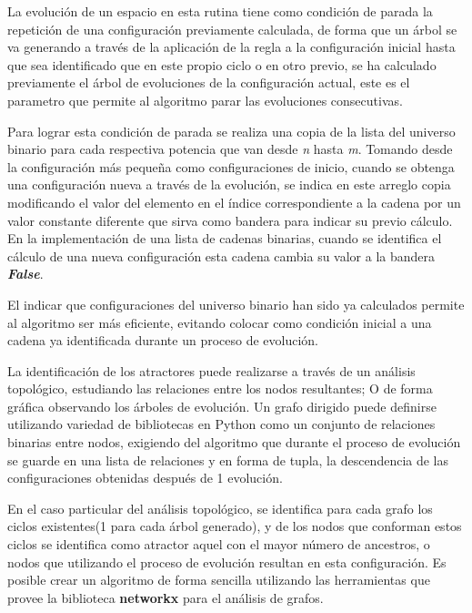 \documentclass[]{article}
\begin{document}
			\hfill\break
			\justifying
			La evolución de un espacio en esta rutina tiene como condición de parada la repetición de una configuración previamente calculada, de forma que un árbol se va generando a través de la aplicación de la regla a la configuración inicial hasta que sea identificado que en este propio ciclo o en otro previo, se ha calculado previamente el árbol de evoluciones de la configuración actual, este es el parametro que permite al algoritmo parar las evoluciones consecutivas.
			
			\hfill\break
			\justifying
			Para lograr esta condición de parada se realiza una copia de la lista del universo binario para cada respectiva potencia que van desde \textit{n} hasta \textit{m}. Tomando desde la configuración más pequeña como configuraciones de inicio, cuando se obtenga una configuración nueva a través de la evolución, se indica en este arreglo copia modificando el valor del elemento en el índice correspondiente a la cadena por un valor constante diferente que sirva como bandera para indicar su previo cálculo. En la implementación de una lista de cadenas binarias, cuando se identifica el cálculo de una nueva configuración esta cadena cambia su valor a la bandera \textit{\textbf{False}}.
			
			\hfill\break
			\justifying
			El indicar que configuraciones del universo binario han sido ya calculados permite al algoritmo ser más eficiente, evitando colocar como condición inicial a una cadena ya identificada durante un proceso de evolución.
			
			\hfill\break
			\justifying
			La identificación de los atractores puede realizarse a través de un análisis topológico, estudiando las relaciones entre los nodos resultantes; O de forma gráfica observando los árboles de evolución. Un grafo dirigido puede definirse utilizando variedad de bibliotecas en Python como un conjunto de relaciones binarias entre nodos, exigiendo del algoritmo que durante el proceso de evolución se guarde en una lista de relaciones y en forma de tupla, la descendencia de las configuraciones obtenidas después de 1 evolución.
			
			\hfill\break
			\justifying
			En el caso particular del análisis topológico, se identifica para cada grafo los ciclos existentes(1 para cada árbol generado), y de los nodos que conforman estos ciclos se identifica como atractor aquel con el mayor número de ancestros, o nodos que utilizando el proceso de evolución resultan en esta configuración. Es posible crear un algoritmo de forma sencilla utilizando las herramientas que provee la biblioteca \textbf{networkx} para el análisis de grafos.
			
\end{document}
